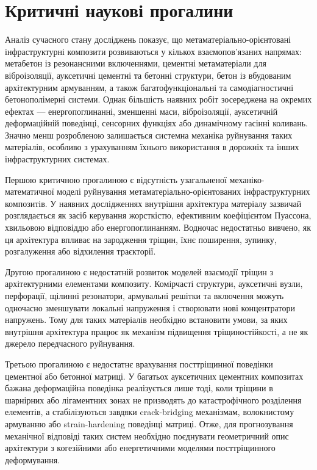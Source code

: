 \documentclass[12pt,a4paper]{article}
\begin{document}
\section{Критичні наукові прогалини}

Аналіз сучасного стану досліджень показує, що метаматеріально-орієнтовані інфраструктурні композити розвиваються у кількох взаємопов'язаних напрямах: метабетон із резонансними включеннями, цементні метаматеріали для віброізоляції, ауксетичні цементні та бетонні структури, бетон із вбудованим архітектурним армуванням, а також багатофункціональні та самодіагностичні бетонополімерні системи. Однак більшість наявних робіт зосереджена на окремих ефектах --- енергопоглинанні, зменшенні маси, віброізоляції, ауксетичній деформаційній поведінці, сенсорних функціях або динамічному гасінні коливань. Значно менш розробленою залишається системна механіка руйнування таких матеріалів, особливо з урахуванням їхнього використання в дорожніх та інших інфраструктурних системах.

Першою критичною прогалиною є відсутність узагальненої механіко-математичної моделі руйнування метаматеріально-орієнтованих інфраструктурних композитів. У наявних дослідженнях внутрішня архітектура матеріалу зазвичай розглядається як засіб керування жорсткістю, ефективним коефіцієнтом Пуассона, хвильовою відповіддю або енергопоглинанням. Водночас недостатньо вивчено, як ця архітектура впливає на зародження тріщин, їхнє поширення, зупинку, розгалуження або відхилення траєкторії.

Другою прогалиною є недостатній розвиток моделей взаємодії тріщин з архітектурними елементами композиту. Комірчасті структури, ауксетичні вузли, перфорації, щілинні резонатори, армувальні решітки та включення можуть одночасно зменшувати локальні напруження і створювати нові концентратори напружень. Тому для таких матеріалів необхідно встановити умови, за яких внутрішня архітектура працює як механізм підвищення тріщиностійкості, а не як джерело передчасного руйнування.

Третьою прогалиною є недостатнє врахування посттріщинної поведінки цементної або бетонної матриці. У багатьох ауксетичних цементних композитах бажана деформаційна поведінка реалізується лише тоді, коли тріщини в шарнірних або лігаментних зонах не призводять до катастрофічного розділення елементів, а стабілізуються завдяки crack-bridging механізмам, волокнистому армуванню або strain-hardening поведінці матриці. Отже, для прогнозування механічної відповіді таких систем необхідно поєднувати геометричний опис архітектури з когезійними або енергетичними моделями посттріщинного деформування.
\end{document}
